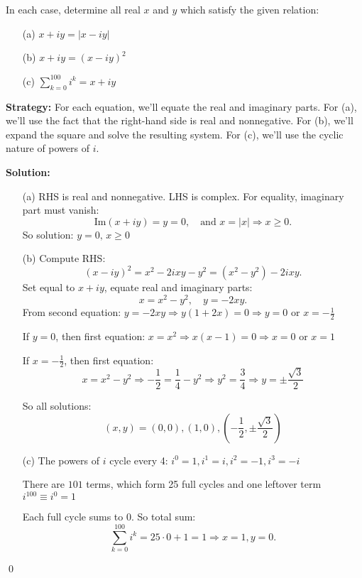 \begin{problembox}
\begin{problemstatement}
In each case, determine all real \( x \) and \( y \) which satisfy the given relation:

\begin{enumerate}
\item[(a)] \( x + iy = |x - iy| \)
\item[(b)] \( x + iy = (x - iy)^2 \)
\item[(c)] \( \sum_{k=0}^{100} i^k = x + iy \)
\end{enumerate}
\end{problemstatement}
\end{problembox}

\noindent\textbf{Strategy:} For each equation, we'll equate the real and imaginary parts. For (a), we'll use the fact that the right-hand side is real and nonnegative. For (b), we'll expand the square and solve the resulting system. For (c), we'll use the cyclic nature of powers of $i$.

\bigskip\noindent\textbf{Solution:}

\begin{itemize}
\item[(a)] RHS is real and nonnegative. LHS is complex. For equality, imaginary part must vanish:
\[
\text{Im}(x + iy) = y = 0, \quad \text{and } x = |x| \Rightarrow x \geq 0.
\]
So solution: \( y = 0,\, x \geq 0 \)

\item[(b)] Compute RHS:
\[
(x - iy)^2 = x^2 - 2ixy - y^2 = (x^2 - y^2) - 2ixy.
\]
Set equal to \( x + iy \), equate real and imaginary parts:
\[
x = x^2 - y^2,\quad y = -2xy.
\]
From second equation: \( y = -2xy \Rightarrow y(1 + 2x) = 0 \Rightarrow y = 0 \) or \( x = -\frac{1}{2} \)

If \( y = 0 \), then first equation: \( x = x^2 \Rightarrow x(x - 1) = 0 \Rightarrow x = 0 \) or \( x = 1 \)

If \( x = -\frac{1}{2} \), then first equation:
\[
x = x^2 - y^2 \Rightarrow -\frac{1}{2} = \frac{1}{4} - y^2 \Rightarrow y^2 = \frac{3}{4} \Rightarrow y = \pm \frac{\sqrt{3}}{2}
\]

So all solutions:
\[
(x,y) = (0,0), (1,0), \left(-\frac{1}{2}, \pm \frac{\sqrt{3}}{2} \right)
\]

\item[(c)] The powers of \( i \) cycle every 4: \( i^0 = 1, i^1 = i, i^2 = -1, i^3 = -i \)

There are \( 101 \) terms, which form 25 full cycles and one leftover term \( i^{100} \equiv i^0 = 1 \)

Each full cycle sums to 0. So total sum:
\[
\sum_{k=0}^{100} i^k = 25 \cdot 0 + 1 = 1
\Rightarrow x = 1, y = 0.
\]
\end{itemize}\qed


